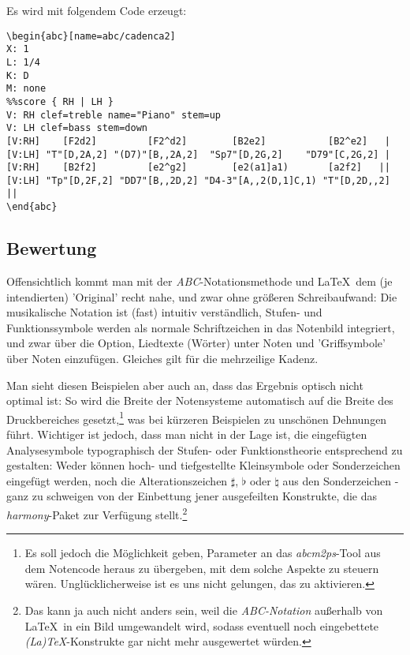 Es wird mit folgendem Code erzeugt:
\begin{verbatim}
\begin{abc}[name=abc/cadenca2]
X: 1
L: 1/4 
K: D 
M: none
%%score { RH | LH }
V: RH clef=treble name="Piano" stem=up
V: LH clef=bass stem=down
[V:RH]    [F2d2]         [F2^d2]        [B2e2]           [B2^e2]   |
[V:LH] "T"[D,2A,2] "(D7)"[B,,2A,2]  "Sp7"[D,2G,2]    "D79"[C,2G,2] |
[V:RH]    [B2f2]         [e2^g2]        [e2(a1]a1)       [a2f2]   ||
[V:LH] "Tp"[D,2F,2] "DD7"[B,,2D,2] "D4-3"[A,,2(D,1]C,1) "T"[D,2D,,2] ||
\end{abc}
\end{verbatim}

\subsection{Bewertung}

Offensichtlich kommt man mit der \textit{ABC}-Notationsmethode und \LaTeX\ dem
(je intendierten) 'Original' recht nahe, und zwar ohne größeren
Schreibaufwand: Die musikalische Notation ist (fast) intuitiv verständlich, Stufen-
und Funktionssymbole werden als normale Schriftzeichen in das Notenbild
integriert, und zwar über die Option, Liedtexte (Wörter) unter Noten und
'Griffsymbole' über Noten einzufügen. Gleiches gilt für die mehrzeilige Kadenz.

Man sieht diesen Beispielen aber auch an, dass das Ergebnis optisch nicht
optimal ist: So wird die Breite der Notensysteme automatisch auf die Breite des
Druckbereiches gesetzt,\footnote{Es soll jedoch die Möglichkeit geben, Parameter
an das \textit{abcm2ps}-Tool aus dem Notencode heraus zu übergeben, mit dem
solche Aspekte zu steuern wären. Unglücklicherweise ist es uns nicht gelungen,
das zu aktivieren.} was bei kürzeren Beispielen zu unschönen Dehnungen führt.
\label{AppraisalABC}Wichtiger ist jedoch, dass man nicht in der Lage ist, die
eingefügten Analysesymbole typographisch der Stufen- oder Funktionstheorie
entsprechend zu gestalten: Weder können hoch- und tiefgestellte Kleinsymbole
oder Sonderzeichen eingefügt werden, noch die Alterationszeichen $\sharp$,
$\flat$ oder $\natural$ aus den Sonderzeichen - ganz zu schweigen von der
Einbettung jener ausgefeilten Konstrukte, die das \textit{harmony}-Paket zur
Verfügung stellt.\footnote{Das kann ja auch nicht anders sein, weil die
\textit{ABC-Notation} außerhalb von \LaTeX\ in ein Bild umgewandelt wird, sodass
eventuell noch eingebettete \textit{(La)\TeX}-Konstrukte gar nicht mehr
ausgewertet würden.}

